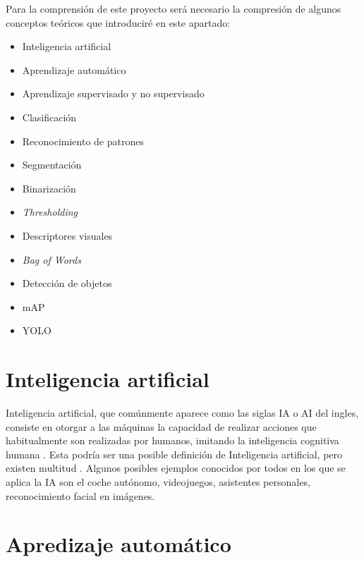 

Para la comprensión de este proyecto será necesario la compresión de algunos conceptos teóricos que introduciré en este apartado:

\begin{itemize}
	\item Inteligencia artificial
	\item Aprendizaje automático
	\item Aprendizaje supervisado y no supervisado
	\item Clasificación
	\item Reconocimiento de patrones
	\item Segmentación
	\item Binarización
	\item \textit{Thresholding}
	\item Descriptores visuales
	\item \textit{Bag of Words}
	\item Detección de objetos
	\item mAP
	\item YOLO
\end{itemize}


\section{Inteligencia artificial}

Inteligencia artificial, que comúnmente aparece como las siglas IA o AI del ingles, consiste en otorgar a las máquinas la capacidad de realizar acciones que habitualmente son realizadas por humanos, imitando la inteligencia cognitiva humana \cite{alanturing:ai}. Esta podría ser una posible definición de Inteligencia artificial, pero existen multitud \cite{russell1995modern}. Algunos posibles ejemplos conocidos por todos en los que se aplica la IA son el coche autónomo, videojuegos, asistentes personales, reconocimiento facial en imágenes.

\section{Apredizaje automático}

